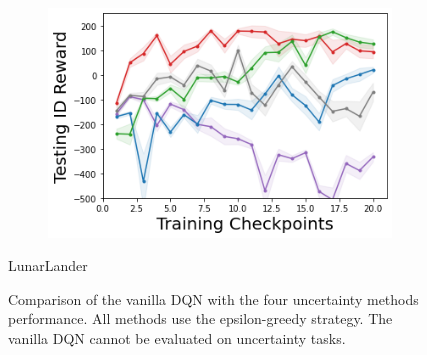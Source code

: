 \begin{figure}
\begin{subfigure}{.3\textwidth}
        \includegraphics[width=\textwidth]{sections/011_icml2022/resources/LunarLander-v2-mean_reward_-testing-model+.png}
    \end{subfigure}
    \vspace{-3mm}
    \caption*{LunarLander}
    \vspace{2mm}
    
    \caption{Comparison of the vanilla DQN with the four uncertainty methods performance. All methods use the epsilon-greedy strategy. The vanilla DQN cannot be evaluated on uncertainty tasks.}
    \label{fig:camprison-vanilla}
\end{figure}